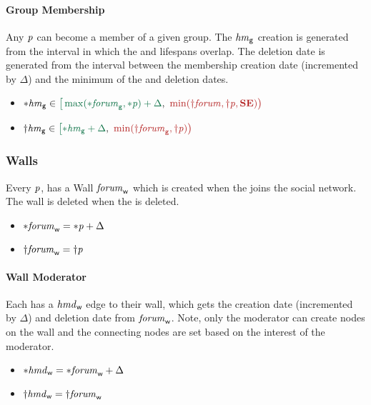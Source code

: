\paragraph{Group Membership}
Any \tPerson $\mathit{p}$ can become a member of a given group. The \tHasMember $\mathit{hm}_{\mathsf{g}}$ creation is generated from the interval in which the \tPerson and \tForum lifespans overlap. The deletion date is generated from the interval between the membership creation date (incremented by $\Delta$) and the minimum of the \tPerson and \tForum deletion dates.
\begin{itemize}
    \item $\varc{\eHasMember}_{\mathsf{g}} \in \interval{\max ( \varc{\eForum}_{\mathsf{g}}, \varc{\ePerson}) + \Delta}{\min (\vard{\eForum}, \vard{\ePerson}, \xSE)} $
    \item $\vard{\eHasMember}_{\mathsf{g}} \in \interval{\varc{\eHasMember}_{\mathsf{g}} + \Delta}{\min (\vard{\eForum}_{\mathsf{g}}, \vard{\ePerson})}$
\end{itemize}

\subsubsection{Walls}
Every \tPerson $\mathit{p}$, has a Wall $\mathit{forum}_\textsf{w}$ which is created when the \tPerson joins the social network. The wall is deleted when the \tPerson is deleted.
\begin{itemize}
    \item ${\ast}\mathit{\mathit{forum}}_{\mathsf{w}} = {\ast}\mathit{\mathit{p}} + \Delta$
    \item ${\dagger}\mathit{\mathit{forum}}_{\mathsf{w}} = {\dagger}\mathit{\mathit{p}}$
\end{itemize}

\paragraph{Wall Moderator}
Each \tPerson has a \tHasModerator $\mathit{hmd}_{\mathsf{w}}$ edge to their wall, which gets the creation date (incremented by $\Delta$) and deletion date from $\mathit{forum}_\textsf{w}$.
Note, only the moderator can create \tPost nodes on the wall and the connecting \tTag nodes are set based on the interest of the moderator.
\begin{itemize}
    \item ${\ast}\mathit{\mathit{hmd}}_{\mathsf{w}} = {\ast}\mathit{\mathit{forum}}_{\mathsf{w}} + \Delta$
    \item ${\dagger}\mathit{\mathit{hmd}}_{\mathsf{w}} = {\dagger}\mathit{\mathit{forum}}_{\mathsf{w}}$
\end{itemize}

